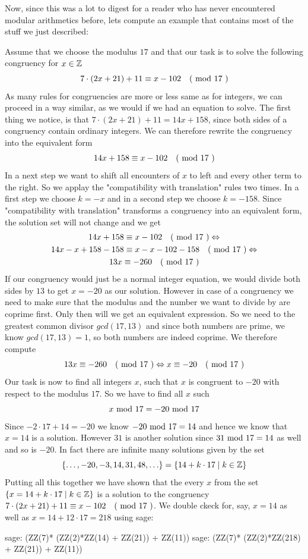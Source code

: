 Now, since this was a lot to digest for a reader who has never encountered modular arithmetics before, lets compute an example that contains most of the stuff we just described:   
   
\begin{example}Assume that we choose the modulus $17$ and that our task is to solve the following congruency for $x\in \mathbb{Z}$
$$7\cdot(2x+21) + 11 \equiv x-102 \quad \text{( mod } 17 \text{ )}$$
As many rules for congruencies are more or less same as for integers, we can proceed in a way similar, as we would if we had an equation to solve. 
The first thing we notice, is that $7\cdot(2x+21) + 11= 14x +158$, since both sides of a congruency contain ordinary integers. We can therefore rewrite the congruency into the equivalent form
$$14x +158 \equiv x-102 \quad \text{( mod } 17 \text{ )}$$
In a next step we want to shift all encounters of $x$ to left and every other term to the right. So we applay the "compatibility with translation" rules two times. In a first step we choose $k=-x$ and in a second step we choose $k=-158$. Since "compatibility with translation" transforms a congruency into an equivalent form, the solution set will not change and we get 
\begin{multline*}
14x +158 \equiv x-102 \quad \text{( mod } 17 \text{ )} \Leftrightarrow\\
14x-x +158-158 \equiv x-x-102-158 \quad \text{( mod } 17 \text{ )} \Leftrightarrow \\
13x \equiv -260 \quad \text{( mod } 17 \text{ )}
\end{multline*}
If our congruency would just be a normal integer equation, we would divide both sides by $13$ to get $x=-20$ as our solution. However in case of a congruency we need to make sure that the modulus and the number we want to divide by are coprime first. Only then will we get an equivalent expression. So we need to the greatest common divisor $gcd(17,13)$ and since both numbers are prime, we know $gcd(17,13)=1$, so both numbers are indeed coprime. We therefore compute 
$$
13x \equiv -260 \quad \text{( mod } 17 \text{ )} \Leftrightarrow x \equiv -20 \quad \text{( mod } 17 \text{ )}
$$
Our task is now to find all integers $x$, such that $x$ is congruent to $-20$ with respect to the modulus $17$. So we have to find all $x$ such
$$
x \text{ mod } 17 = -20 \text{ mod } 17
$$
Since $-2\cdot 17 +14 = -20$ we know $ -20 \text{ mod } 17 = 14$ and hence we know that $x=14$ is a solution. However $31$ is another solution since $ 31 \text{ mod } 17 = 14$ as well and so is $-20$. In fact there are infinite many solutions given by the set
$$
\{\ldots, -20,-3, 14,31, 48,\ldots\} = \{14+k\cdot 17 \;|\; k\in \mathbb{Z}\}
$$
Putting all this together we have shown that the every $x$ from the set $\{x=14+k\cdot 17 \;|\; k\in \mathbb{Z}\}$ is a solution to the congruency $7\cdot(2x+21) + 11 \equiv x-102 \quad \text{( mod } 17 \text{ )}$. We double ckeck for, say, $x=14$ as well as $x=14 + 12\cdot 17 = 218$ using sage:
\begin{sagecommandline}
sage: (ZZ(7)* (ZZ(2)*ZZ(14) + ZZ(21)) + ZZ(11))  %
sage: (ZZ(7)* (ZZ(2)*ZZ(218) + ZZ(21)) + ZZ(11))  %
\end{sagecommandline}
\end{example}
